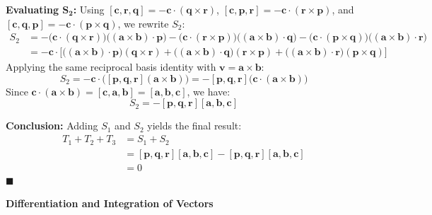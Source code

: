 \documentclass[12pt,a4paper]{article}
\newcommand{\subtopic}[2]{%
  \vspace{10pt}
  \noindent\begin{tcolorbox}[colback=#1!8,colframe=#1,boxrule=0.6pt,arc=4pt,
    left=6pt,right=6pt,top=4pt,bottom=4pt]
    \small\bfseries\textcolor{#1}{#2}
  \end{tcolorbox}
  \vspace{2pt}
}
\begin{document}
\begin{enumerate}
\begin{tcolorbox}[enhanced,breakable,ansbox,colback=cD!4,colframe=cD,boxrule=0.8pt,arc=5pt,title={\textbf{Answer}},fonttitle=\bfseries\color{white},colbacktitle=cD]
\textbf{Evaluating $\boldsymbol{S_2}$:}
Using $[\mathbf{c}, \mathbf{r}, \mathbf{q}] = -\mathbf{c}\cdot(\mathbf{q}\times\mathbf{r})$, $[\mathbf{c}, \mathbf{p}, \mathbf{r}] = -\mathbf{c}\cdot(\mathbf{r}\times\mathbf{p})$, and $[\mathbf{c}, \mathbf{q}, \mathbf{p}] = -\mathbf{c}\cdot(\mathbf{p}\times\mathbf{q})$, we rewrite $S_2$:
\begin{align*}
    S_2 &= -\big( \mathbf{c}\cdot(\mathbf{q}\times\mathbf{r}) \big) \big( (\mathbf{a}\times\mathbf{b})\cdot\mathbf{p} \big) - \big( \mathbf{c}\cdot(\mathbf{r}\times\mathbf{p}) \big) \big( (\mathbf{a}\times\mathbf{b})\cdot\mathbf{q} \big) - \big( \mathbf{c}\cdot(\mathbf{p}\times\mathbf{q}) \big) \big( (\mathbf{a}\times\mathbf{b})\cdot\mathbf{r} \big) \\
    &= -\mathbf{c} \cdot \Big[ \big( (\mathbf{a}\times\mathbf{b})\cdot\mathbf{p} \big)(\mathbf{q}\times\mathbf{r}) + \big( (\mathbf{a}\times\mathbf{b})\cdot\mathbf{q} \big)(\mathbf{r}\times\mathbf{p}) + \big( (\mathbf{a}\times\mathbf{b})\cdot\mathbf{r} \big)(\mathbf{p}\times\mathbf{q}) \Big]
\end{align*}
Applying the same reciprocal basis identity with $\mathbf{v} = \mathbf{a}\times\mathbf{b}$:
\[ S_2 = -\mathbf{c} \cdot \big( [\mathbf{p}, \mathbf{q}, \mathbf{r}] (\mathbf{a}\times\mathbf{b}) \big) = -[\mathbf{p}, \mathbf{q}, \mathbf{r}] \big( \mathbf{c} \cdot (\mathbf{a}\times\mathbf{b}) \big) \]
Since $\mathbf{c} \cdot (\mathbf{a}\times\mathbf{b}) = [\mathbf{c}, \mathbf{a}, \mathbf{b}] = [\mathbf{a}, \mathbf{b}, \mathbf{c}]$, we have:
\[ S_2 = -[\mathbf{p}, \mathbf{q}, \mathbf{r}][\mathbf{a}, \mathbf{b}, \mathbf{c}] \]

\textbf{Conclusion:}
Adding $S_1$ and $S_2$ yields the final result:
\begin{align*}
    T_1 + T_2 + T_3 &= S_1 + S_2 \\
    &= [\mathbf{p}, \mathbf{q}, \mathbf{r}][\mathbf{a}, \mathbf{b}, \mathbf{c}] - [\mathbf{p}, \mathbf{q}, \mathbf{r}][\mathbf{a}, \mathbf{b}, \mathbf{c}] \\
    &= 0
\end{align*}
\hfill $\blacksquare$

\end{tcolorbox}

\end{enumerate}
\subtopic{cD}{Differentiation and Integration of Vectors}
\label{sub:s4-diffint}
\end{document}
